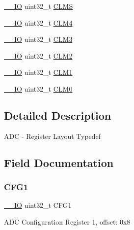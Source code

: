 \begin{DoxyCompactItemize}
\mbox{\hyperlink{core__cm0plus_8h_aec43007d9998a0a0e01faede4133d6be}{\+\_\+\+\_\+\+IO}} uint32\+\_\+t \mbox{\hyperlink{struct_a_d_c___type_a58148ff5ccf31e3492e95fefe99ada53}{C\+L\+MS}}
\item 
\mbox{\hyperlink{core__cm0plus_8h_aec43007d9998a0a0e01faede4133d6be}{\+\_\+\+\_\+\+IO}} uint32\+\_\+t \mbox{\hyperlink{struct_a_d_c___type_ae20cd4616d206938dcbdd0d89294a1c5}{C\+L\+M4}}
\item 
\mbox{\hyperlink{core__cm0plus_8h_aec43007d9998a0a0e01faede4133d6be}{\+\_\+\+\_\+\+IO}} uint32\+\_\+t \mbox{\hyperlink{struct_a_d_c___type_a1cc2d6954ca002237cf69c29c4c8fdaf}{C\+L\+M3}}
\item 
\mbox{\hyperlink{core__cm0plus_8h_aec43007d9998a0a0e01faede4133d6be}{\+\_\+\+\_\+\+IO}} uint32\+\_\+t \mbox{\hyperlink{struct_a_d_c___type_a4711a30f2fd22f8aeab7f895a48e23e5}{C\+L\+M2}}
\item 
\mbox{\hyperlink{core__cm0plus_8h_aec43007d9998a0a0e01faede4133d6be}{\+\_\+\+\_\+\+IO}} uint32\+\_\+t \mbox{\hyperlink{struct_a_d_c___type_af1f1f4e8be5d496b5ee572702254ca97}{C\+L\+M1}}
\item 
\mbox{\hyperlink{core__cm0plus_8h_aec43007d9998a0a0e01faede4133d6be}{\+\_\+\+\_\+\+IO}} uint32\+\_\+t \mbox{\hyperlink{struct_a_d_c___type_a387c7f0803d309215cb3a8e950a3306e}{C\+L\+M0}}
\end{DoxyCompactItemize}


\subsection{Detailed Description}
A\+DC -\/ Register Layout Typedef 

\subsection{Field Documentation}
\mbox{\label{struct_a_d_c___type_abecccecd01b0d465123a2dc166db4141}} 
\subsubsection{\texorpdfstring{CFG1}{CFG1}}
{\footnotesize\ttfamily \mbox{\hyperlink{core__cm0plus_8h_aec43007d9998a0a0e01faede4133d6be}{\+\_\+\+\_\+\+IO}} uint32\+\_\+t C\+F\+G1}

A\+DC Configuration Register 1, offset\+: 0x8 \mbox{\label{struct_a_d_c___type_a722c7bd03a5d7b185bf43bdb5f846d43}} 
